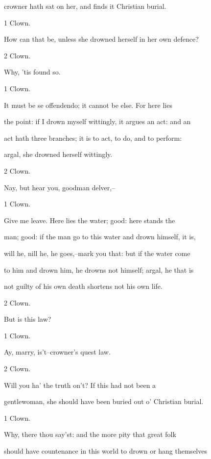 \documentclass[12pt]{book}
\begin{document}
crowner hath sat on her, and finds it Christian burial.



1 Clown.

How can that be, unless she drowned herself in her own defence?



2 Clown.

Why, 'tis found so.



1 Clown.

It must be se offendendo; it cannot be else. For here lies

the point: if I drown myself wittingly, it argues an act: and an

act hath three branches; it is to act, to do, and to perform:

argal, she drowned herself wittingly.



2 Clown.

Nay, but hear you, goodman delver,--



1 Clown.

Give me leave. Here lies the water; good: here stands the

man; good: if the man go to this water and drown himself, it is,

will he, nill he, he goes,--mark you that: but if the water come

to him and drown him, he drowns not himself; argal, he that is

not guilty of his own death shortens not his own life.



2 Clown.

But is this law?



1 Clown.

Ay, marry, is't--crowner's quest law.



2 Clown.

Will you ha' the truth on't? If this had not been a

gentlewoman, she should have been buried out o' Christian burial.



1 Clown.

Why, there thou say'st: and the more pity that great folk

should have countenance in this world to drown or hang themselves
\end{document}
